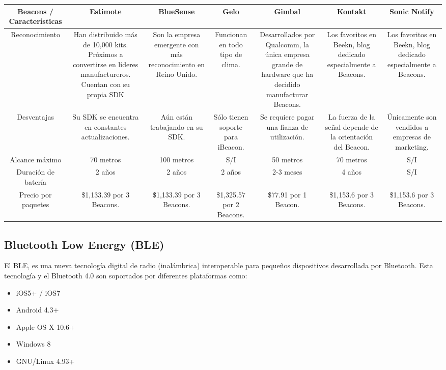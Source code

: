 \FloatBarrier
\begin{table}[htb]
\setlength\extrarowheight{2pt} %
\begin{tabularx}{\textwidth}{|C|C|C|C|C|C|C|}
\hline
\textbf{Beacons / Características} & \textbf{Estimote} & \textbf{BlueSense} & \textbf{Gelo} & \textbf{Gimbal} & \textbf{Kontakt} & \textbf{Sonic Notify} \\\hline
Reconocimiento & Han distribuido más  de 10,000 kits. Próximos a convertirse en líderes manufactureros. Cuentan con su propia SDK & Son la empresa emergente con más reconocimiento en Reino Unido. & Funcionan en todo tipo de clima. & Desarrollados por Qualcomm, la única empresa grande de hardware que ha decidido manufacturar Beacons. & Los favoritos en Beekn, blog dedicado especialmente a Beacons. & Los favoritos en Beekn, blog dedicado especialmente a Beacons. \\ \hline
Desventajas &  Su SDK se encuentra en constantes actualizaciones. & Aún están trabajando en su SDK. & Sólo tienen soporte para iBeacon. & Se requiere pagar una fianza de utilización. & La fuerza de la señal depende de la orientación del Beacon. & Únicamente son vendidos a empresas de marketing. \\ \hline
Alcance máximo & 70 metros & 100 metros &  S/I & 50 metros &  70 metros &  S/I \\ \hline
Duración de batería & 2 años & 2 años & 2 años & 2-3 meses & 4 años & S/I \\ \hline
Precio por paquetes & \$1,133.39 por 3 Beacons. & \$1,133.39 por 3 Beacons. & \$1,325.57 por 2 Beacons. & \$77.91 por 1 Beacon. & \$1,153.6 por 3 Beacons. & \$1,153.6 por 3 Beacons. \\ \hline
\end{tabularx}
\end{table}
\FloatBarrier

\subsection{Bluetooth Low Energy (BLE)}
El BLE, es una nueva tecnología digital de radio (inalámbrica) interoperable para pequeños dispositivos desarrollada por Bluetooth. Esta tecnología y el Bluetooth 4.0 son soportados por diferentes plataformas como:
\FloatBarrier
\begin{itemize}
\item iOS5+ / iOS7
\item Android 4.3+
\item Apple OS X 10.6+
\item Windows 8
\item GNU/Linux 4.93+ \cite{Bluetooth1}
\end{itemize}

